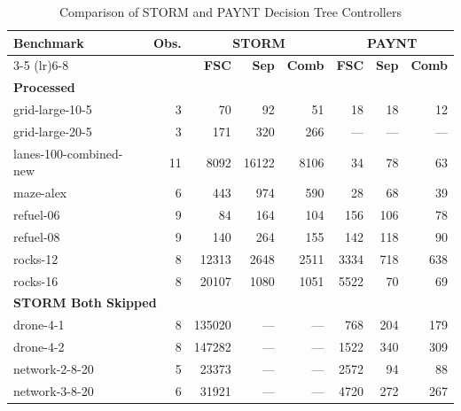 \documentclass{article}
\begin{document}
\begin{table}[htbp]
\centering
\caption{Comparison of STORM and PAYNT Decision Tree Controllers}
\begin{tabular}{lrrrrrrr}
\toprule
\textbf{Benchmark} & \textbf{Obs.} & \multicolumn{3}{c}{\textbf{STORM}} & \multicolumn{3}{c}{\textbf{PAYNT}} \\
\cmidrule(lr){3-5} \cmidrule(lr){6-8}
 & & \textbf{FSC} & \textbf{Sep} & \textbf{Comb} & \textbf{FSC} & \textbf{Sep} & \textbf{Comb} \\
\midrule
\multicolumn{8}{l}{\textbf{Processed}}\\
\quad grid-large-10-5 & 3 & 70 & 92 & 51 & 18 & 18 & 12 \\
\quad grid-large-20-5 & 3 & 171 & 320 & 266 & --- & --- & --- \\
\quad lanes-100-combined-new & 11 & 8092 & 16122 & 8106 & 34 & 78 & 63 \\
\quad maze-alex & 6 & 443 & 974 & 590 & 28 & 68 & 39 \\
\quad refuel-06 & 9 & 84 & 164 & 104 & 156 & 106 & 78 \\
\quad refuel-08 & 9 & 140 & 264 & 155 & 142 & 118 & 90 \\
\quad rocks-12 & 8 & 12313 & 2648 & 2511 & 3334 & 718 & 638 \\
\quad rocks-16 & 8 & 20107 & 1080 & 1051 & 5522 & 70 & 69 \\
\midrule
\multicolumn{8}{l}{\textbf{STORM Both Skipped}}\\
\quad drone-4-1 & 8 & 135020 & --- & --- & 768 & 204 & 179 \\
\quad drone-4-2 & 8 & 147282 & --- & --- & 1522 & 340 & 309 \\
\quad network-2-8-20 & 5 & 23373 & --- & --- & 2572 & 94 & 88 \\
\quad network-3-8-20 & 6 & 31921 & --- & --- & 4720 & 272 & 267 \\
\bottomrule
\end{tabular}
\end{table}
\end{document}

